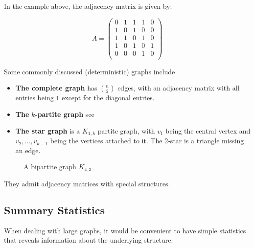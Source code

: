 \documentclass{article}
\begin{document}
In the example above, the adjacency matrix is given by:

\begin{equation*}
        A=\begin{pmatrix}
         0&  1&  1&  1& 0\\
         1&  0&  1&  0& 0\\
         1&  1&  0&  1& 0\\
         1&  0&  1&  0& 1\\
         0&  0&  0&  1& 0\\
    \end{pmatrix}
    \label{tab:adj}
\end{equation*}


Some commonly discussed (deterministic) graphs include
\begin{itemize}
    \item \textbf{The complete graph} has $\binom{n}{2}$ edges, with an adjacency matrix with all entries being $1$ except for the diagonal entries. 
    \item \textbf{The} $k$\textbf{-partite graph} see \citep{DiestelReinhard2017GT}
    \item \textbf{The star graph} is a $K_{1,k}$ partite graph, with $v_1$ being the central vertex and $v_2, \ldots, v_{k-1}$ being the vertices attached to it. The 2-star is a triangle missing an edge. 
\end{itemize}


\begin{figure}[H]
    \centering
    \caption{A bipartite graph $K_{4,3}$}
    \label{fig: example bipartite}
\end{figure}


They admit adjacency matrices with special structures.

\subsection{Summary Statistics}
When dealing with large graphs, it would be convenient to have simple statistics that reveals information about the underlying structure.  
\end{document}
